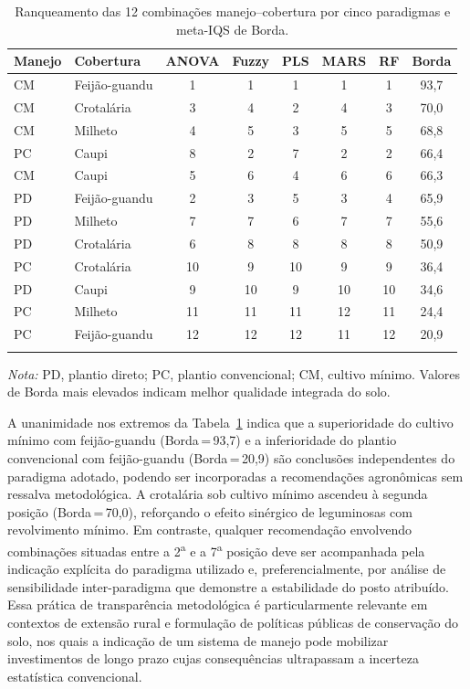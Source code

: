 \documentclass[pdflatex,sn-basic]{sn-jnl}%
\begin{document}
\begin{table}[ht]
\caption{Ranqueamento das 12 combinações manejo--cobertura por cinco paradigmas e meta-IQS de Borda.}\label{tab:ranking}
\begin{tabular*}{\textwidth}{@{\extracolsep\fill}llcccccc}
\toprule
Manejo & Cobertura & ANOVA & Fuzzy & PLS & MARS & RF & Borda \\
\midrule
CM & Feijão-guandu & 1 & 1 & 1 & 1 & 1 & 93,7 \\
CM & Crotalária    & 3 & 4 & 2 & 4 & 3 & 70,0 \\
CM & Milheto       & 4 & 5 & 3 & 5 & 5 & 68,8 \\
PC & Caupi         & 8 & 2 & 7 & 2 & 2 & 66,4 \\
CM & Caupi         & 5 & 6 & 4 & 6 & 6 & 66,3 \\
PD & Feijão-guandu & 2 & 3 & 5 & 3 & 4 & 65,9 \\
PD & Milheto       & 7 & 7 & 6 & 7 & 7 & 55,6 \\
PD & Crotalária    & 6 & 8 & 8 & 8 & 8 & 50,9 \\
PC & Crotalária    &10 & 9 &10 & 9 & 9 & 36,4 \\
PD & Caupi         & 9 &10 & 9 &10 &10 & 34,6 \\
PC & Milheto       &11 &11 &11 &12 &11 & 24,4 \\
PC & Feijão-guandu &12 &12 &12 &11 &12 & 20,9 \\
\botrule
\end{tabular*}
\smallskip\noindent\textit{Nota:} PD, plantio direto; PC, plantio convencional; CM, cultivo mínimo. Valores de Borda mais elevados indicam melhor qualidade integrada do solo.
\end{table}

A unanimidade nos extremos da Tabela~\ref{tab:ranking} indica que a superioridade do cultivo mínimo com feijão-guandu (Borda\,=\,93,7) e a inferioridade do plantio convencional com feijão-guandu (Borda\,=\,20,9) são conclusões independentes do paradigma adotado, podendo ser incorporadas a recomendações agronômicas sem ressalva metodológica. A crotalária sob cultivo mínimo ascendeu à segunda posição (Borda\,=\,70,0), reforçando o efeito sinérgico de leguminosas com revolvimento mínimo. Em contraste, qualquer recomendação envolvendo combinações situadas entre a 2\textsuperscript{a} e a 7\textsuperscript{a} posição deve ser acompanhada pela indicação explícita do paradigma utilizado e, preferencialmente, por análise de sensibilidade inter-paradigma que demonstre a estabilidade do posto atribuído. Essa prática de transparência metodológica é particularmente relevante em contextos de extensão rural e formulação de políticas públicas de conservação do solo, nos quais a indicação de um sistema de manejo pode mobilizar investimentos de longo prazo cujas consequências ultrapassam a incerteza estatística convencional.
\end{document}
